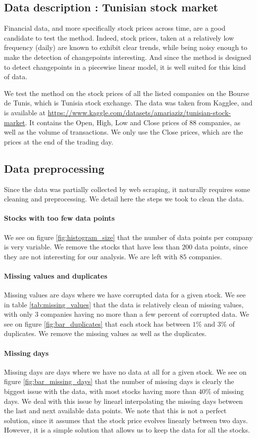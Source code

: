 \documentclass[11pt]{article}
\begin{document}
\subsection{Data description : Tunisian stock market}
Financial data, and more specifically stock prices across time, are a good candidate to test the method. Indeed, stock prices, taken at a relatively low frequency (daily) are known to exhibit clear trends, while being noisy enough to make the detection of changepoints interesting. And since the method is designed to detect changepoints in a piecewise linear model, it is well suited for this kind of data.

We test the method on the stock prices of all the listed companies on the Bourse de Tunis, which is Tunisia stock exchange. The data was taken from Kagglee, and is available at \url{https://www.kaggle.com/datasets/amariaziz/tunisian-stock-market}. It contains the Open, High, Low and Close prices of 88 companies, as well as the volume of transactions. We only use the Close prices, which are the prices at the end of the trading day.
\subsection{Data preprocessing}
Since the data was partially collected by web scraping, it naturally requires some cleaning and preprocessing. We detail here the steps we took to clean the data.
\paragraph*{Stocks with too few data points} We see on figure \ref{fig:histogram_size} that the number of data points per company is very variable. We remove the stocks that have less than $200$ data points, since they are not interesting for our analysis. We are left with $85$ companies.
\paragraph*{Missing values and duplicates} Missing values are days where we have corrupted data for a given stock. We see in table \ref{tab:missing_values} that the data is relatively clean of missing values, with only $3$ companies having no more than a few percent of corrupted data. We see on figure \ref{fig:bar_duplicates} that each stock has between $1\%$ and $3\%$ of duplicates. We remove the missing values as well as the duplicates.
\paragraph*{Missing days} Missing days are days where we have no data at all for a given stock. We see on figure \ref{fig:bar_missing_days} that the number of missing days is clearly the biggest issue with the data, with most stocks having more than $40\%$ of missing days. We deal with this issue by linearl interpolating the missing days between the last and next available data points. We note that this is not a perfect solution, since it assumes that the stock price evolves linearly between two days. However, it is a simple solution that allows us to keep the data for all the stocks.
\end{document}
